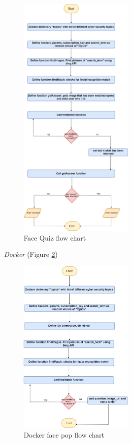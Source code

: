 \documentclass[12pt,a4paper]{article}
\begin{document}
\begin{figure}[h]
    \centering
    \includegraphics[width=0.5\textwidth]{Figs/Face_Quiz (1).png}
    \caption{Face Quiz flow chart} 
    \label{FaceQuiz}
\end{figure}    

\emph{Docker} 
(Figure \ref{DockerFace})

\begin{figure}[h]
    \centering
    \includegraphics[width=0.5\textwidth]{Figs/Docker_face_pop.png} 
    \caption{Docker face pop flow chart} 
    \label{DockerFace}
\end{figure}   
\end{document}
